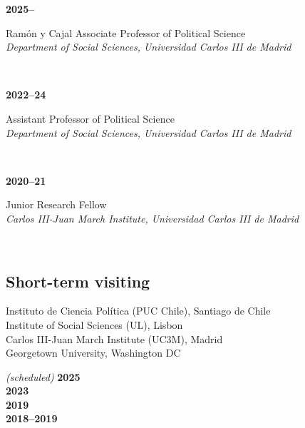 \documentclass[a4paper, 12pt]{article}
\begin{document}
\begin{minipage}[t]{0.12\textwidth}
\textbf{2025--}
\end{minipage}\hfill\begin{minipage}[t]{0.88\textwidth}
Ramón y Cajal Associate Professor of Political Science\\
\textit{Department of Social Sciences, Universidad Carlos III de Madrid}\\\vspace{-8pt}
\end{minipage}\\
\begin{minipage}[t]{0.12\textwidth}
\textbf{2022--24}
\end{minipage}\hfill\begin{minipage}[t]{0.88\textwidth}
Assistant Professor of Political Science\\
\textit{Department of Social Sciences, Universidad Carlos III de Madrid}\\\vspace{-8pt}
\end{minipage}\\
\begin{minipage}[t]{0.12\textwidth}
\textbf{2020--21}
\end{minipage}\hfill\begin{minipage}[t]{0.88\textwidth}
Junior Research Fellow\\
\textit{Carlos III-Juan March Institute, Universidad Carlos III de Madrid}\\\vspace{-8pt}
\end{minipage}\\

\vspace{-10pt}
\subsection*{Short-term visiting}

\begin{minipage}[t]{0.82\textwidth}
	Instituto de Ciencia Política (PUC Chile), Santiago de Chile\vspace{2pt}\\
  Institute of Social Sciences (UL), Lisbon\vspace{2pt}\\
  Carlos III-Juan March Institute (UC3M), Madrid\vspace{2pt}\\
	Georgetown University, Washington DC
\end{minipage}
\begin{minipage}[t]{0.18\textwidth}
  \flushright
	\textit{(scheduled)} \textbf{2025}\\\vspace{7pt}
	\textbf{2023}\\\vspace{7pt}
  \textbf{2019}\\\vspace{7pt}
	\textbf{2018--2019}
\end{minipage}
\end{document}
